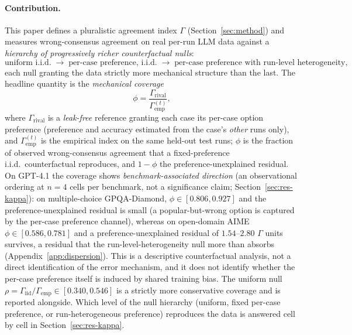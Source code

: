 \documentclass[a4paper,fleqn]{cas-sc}
\newcommand{\agreementIndex}{\Gamma}
\begin{document}
\paragraph{Contribution.} This paper defines a pluralistic agreement index $\agreementIndex$
(Section~\ref{sec:method}) and measures wrong-consensus agreement on real
per-run LLM data against a \emph{hierarchy of progressively richer
counterfactual nulls}:
\[
\text{uniform i.i.d.}
\;\to\;
\text{per-case preference, i.i.d.}
\;\to\;
\text{per-case preference with run-level heterogeneity},
\]
each null granting the data strictly more mechanical structure than the
last. The headline quantity is the \emph{mechanical coverage}
\begin{equation}
\phi = \frac{\agreementIndex_{\mathrm{rival}}}{\agreementIndex_{\mathrm{emp}}^{(t)}},
\end{equation}
where $\agreementIndex_{\mathrm{rival}}$ is a
\emph{leak-free} reference granting each case its per-case option
preference (preference and accuracy estimated from the case's
\emph{other} runs only), and $\agreementIndex_{\mathrm{emp}}^{(t)}$ is the
empirical index on the same held-out test runs; $\phi$ is the fraction
of observed wrong-consensus agreement that a fixed-preference i.i.d.\
counterfactual reproduces, and $1-\phi$ the
preference-unexplained residual. On GPT-4.1 the coverage shows
\emph{benchmark-associated direction} (an observational ordering at
$n=4$ cells per benchmark, not a significance claim;
Section~\ref{sec:res-kappa}): on
multiple-choice GPQA-Diamond, $\phi\in[0.806,0.927]$ and the
preference-unexplained
residual is small (a popular-but-wrong option is captured by
the per-case preference channel), whereas on open-domain AIME
$\phi\in[0.586,0.781]$
and a preference-unexplained residual of $1.54$--$2.80$ $\agreementIndex$ units
survives, a residual that the run-level-heterogeneity null more than
absorbs (Appendix~\ref{app:dispersion}).
This is a descriptive counterfactual analysis, not a direct
identification of the
error mechanism, and it does not identify whether the per-case
preference itself is induced by shared training bias. The uniform null
$\rho = \agreementIndex_{\mathrm{iid}}/\agreementIndex_{\mathrm{emp}} \in [0.340,0.546]$ is a
strictly more conservative coverage and is reported alongside.
Which level of the null hierarchy (uniform, fixed per-case preference,
or run-heterogeneous preference) reproduces the data
is answered cell by cell in Section~\ref{sec:res-kappa}.
\end{document}
